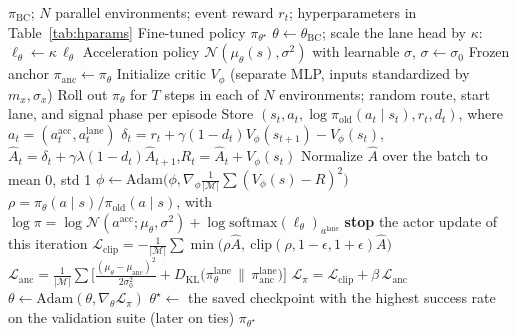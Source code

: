 \documentclass[10pt]{article}
\newcommand{\KL}{D_{\mathrm{KL}}}
\begin{document}
\begin{algorithm}[t]
\caption{Anchored PPO fine-tuning from the BC policy}
\label{alg:ppo}
\begin{algorithmic}[1]
\Require $\pi_{\mathrm{BC}}$; $N$ parallel environments; event reward $r_t$; hyperparameters in Table~\ref{tab:hparams}
\Ensure Fine-tuned policy $\pi_{\theta^\star}$
\State $\theta \gets \theta_{\mathrm{BC}}$; scale the lane head by $\kappa$: $\ell_\theta \gets \kappa\,\ell_\theta$ 
\State Acceleration policy $\mathcal{N}(\mu_\theta(s), \sigma^2)$ with learnable $\sigma$, $\sigma \gets \sigma_0$
\State Frozen anchor $\pi_{\mathrm{anc}} \gets \pi_\theta$ 
\State Initialize critic $V_\phi$ (separate MLP, inputs standardized by $m_x,\sigma_x$)
  \State Roll out $\pi_\theta$ for $T$ steps in each of $N$ environments; random route, start lane, and signal phase per episode
  \State Store $(s_t, a_t, \log\pi_{\mathrm{old}}(a_t\mid s_t), r_t, d_t)$, where $a_t = (a^{\mathrm{acc}}_t, a^{\mathrm{lane}}_t)$
  \State $\delta_t = r_t + \gamma(1-d_t)V_\phi(s_{t+1}) - V_\phi(s_t)$,\quad $\hat A_t = \delta_t + \gamma\lambda(1-d_t)\hat A_{t+1}$,\quad $R_t = \hat A_t + V_\phi(s_t)$
  \State Normalize $\hat A$ over the batch to mean 0, std 1
   
     \State $\phi \gets \mathrm{Adam}\big(\phi, \nabla_\phi \tfrac{1}{|\mathcal{M}|}\sum (V_\phi(s)-R)^2\big)$ \EndFor
  \EndFor
   
        \State $\rho = \pi_\theta(a\mid s)/\pi_{\mathrm{old}}(a\mid s)$, with $\log\pi = \log\mathcal{N}(a^{\mathrm{acc}};\mu_\theta,\sigma^2) + \log\mathrm{softmax}(\ell_\theta)_{a^{\mathrm{lane}}}$
         \textbf{stop} the actor update of this iteration \EndIf
        \State $\displaystyle \mathcal{L}_{\mathrm{clip}} = -\frac{1}{|\mathcal{M}|}\sum \min\!\big(\rho\hat A,\ \mathrm{clip}(\rho,1-\epsilon,1+\epsilon)\hat A\big)$
        \State $\displaystyle \mathcal{L}_{\mathrm{anc}} = \frac{1}{|\mathcal{M}|}\sum\Big[\frac{(\mu_\theta-\mu_{\mathrm{anc}})^2}{2\sigma_0^2} + \KL\big(\pi^{\mathrm{lane}}_\theta\,\|\,\pi^{\mathrm{lane}}_{\mathrm{anc}}\big)\Big]$
        \State $\mathcal{L}_\pi = \mathcal{L}_{\mathrm{clip}} + \beta\,\mathcal{L}_{\mathrm{anc}}$ 
        \State $\theta \gets \mathrm{Adam}(\theta, \nabla_\theta \mathcal{L}_\pi)$ 
      \EndFor
    \EndFor
  \EndIf
\EndFor
\State $\theta^\star \gets$ the saved checkpoint with the highest success rate on the validation suite (later on ties)
\State \Return $\pi_{\theta^\star}$ 
\end{algorithmic}
\end{algorithm}
\end{document}
